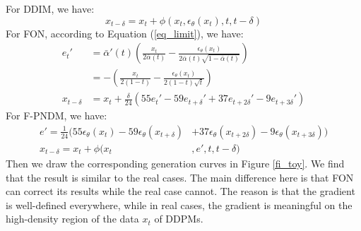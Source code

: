 \documentclass{article}
\begin{document}
For DDIM, we have:
\begin{equation}
      x_{t-\delta}=x_t + \phi(x_t, \epsilon_\theta(x_t), t, t-\delta)
\end{equation}
For FON, according to Equation (\ref{eq_limit}), we have:
\begin{equation}
   \begin{split}
      e_t' & = \bar{\alpha}'(t)\left(\frac{x_t}{2\bar{\alpha}(t)}-\frac{\epsilon_\theta(x_t)}{2\bar{\alpha}(t)\sqrt{1-\bar{\alpha}(t)}}\right) \\
           & = -\left(\frac{x_t}{2(1-t)}-\frac{\epsilon_\theta(x_t)}{2(1-t)\sqrt{t}}\right) \\
      x_{t-\delta} & = x_t + \frac{\delta}{24}(55e_t'-59e_{t+\delta}'+37e_{t+2\delta}'-9e_{t+3\delta}')
   \end{split}
\end{equation}
For F-PNDM, we have:
\begin{equation}
   \begin{split}
      e' = \frac{1}{24}(55\epsilon_\theta(x_t)-59\epsilon_\theta(x_{t+\delta})&+37\epsilon_\theta(x_{t+2\delta})-9\epsilon_\theta(x_{t+3\delta})) \\
      x_{t-\delta} = x_t + \phi(x_t&, e', t, t-\delta)
   \end{split}
\end{equation}
Then we draw the corresponding generation curves in Figure \ref{fi_toy}. We find that the result is similar to the real cases. The main difference here is that FON can correct its results while the real case cannot. The reason is that the gradient is well-defined everywhere, while in real cases, the gradient is meaningful on the high-density region of the data $x_t$ of DDPMs.
\end{document}

